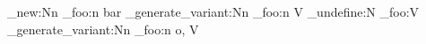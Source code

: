 \cs_new:Nn
  \module_foo:n
  { bar }
\cs_generate_variant:Nn
  \module_foo:n
  { V }
\cs_undefine:N
  \module_foo:V
\cs_generate_variant:Nn
  \module_foo:n
  { o, V }
